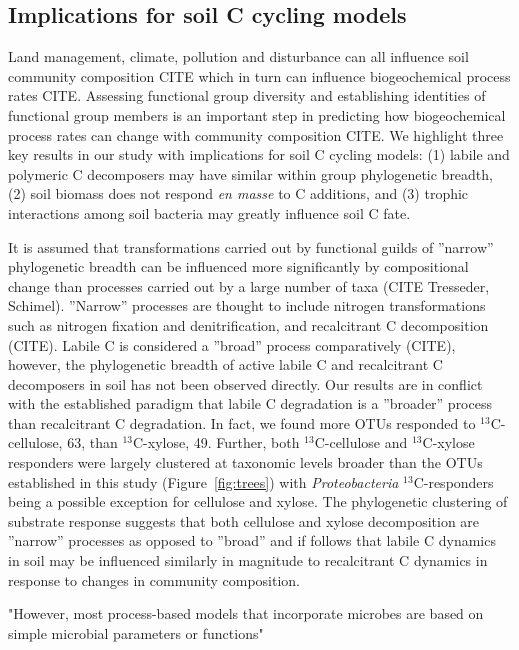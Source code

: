 \subsection{Implications for soil C cycling models}
Land management, climate, pollution and disturbance can all influence soil
community composition CITE which in turn can influence biogeochemical process
rates CITE. Assessing functional group diversity and establishing identities of
functional group members is an important step in predicting how biogeochemical
process rates can change with community composition CITE. We highlight three
key results in our study with implications for soil C cycling models: (1)
labile and polymeric C decomposers may have similar within group phylogenetic
breadth, (2) soil biomass does not respond \textit{en masse} to C additions, and
(3) trophic interactions among soil bacteria may greatly influence soil C fate.

It is assumed that transformations carried out by functional guilds of
''narrow'' phylogenetic breadth can be influenced more significantly by
compositional change than processes carried out by a large number of taxa (CITE
Tresseder, Schimel). ''Narrow'' processes are thought to include nitrogen
transformations such as nitrogen fixation and denitrification, and recalcitrant
C decomposition (CITE). Labile C is considered a ''broad'' process
comparatively (CITE), however, the phylogenetic breadth of active labile C and
recalcitrant C decomposers in soil has not been observed directly. Our results
are in conflict with the established paradigm that labile C degradation is
a ''broader'' process than recalcitrant C degradation. In fact, we found more
OTUs responded to $^{13}$C-cellulose, 63, than $^{13}$C-xylose, 49. Further,
both $^{13}$C-cellulose and $^{13}$C-xylose responders were largely clustered
at taxonomic levels broader than the OTUs established in this study
(Figure~\ref{fig:trees}) with \textit{Proteobacteria} $^{13}$C-responders being
a possible exception for cellulose and xylose. The phylogenetic clustering of
substrate response suggests that both cellulose and xylose decomposition are
''narrow'' processes as opposed to ''broad'' and if follows that labile
C dynamics in soil may be influenced similarly in magnitude to recalcitrant
C dynamics in response to changes in community composition. 

"However, most process-based models that incorporate microbes are based on
simple microbial parameters or functions"

